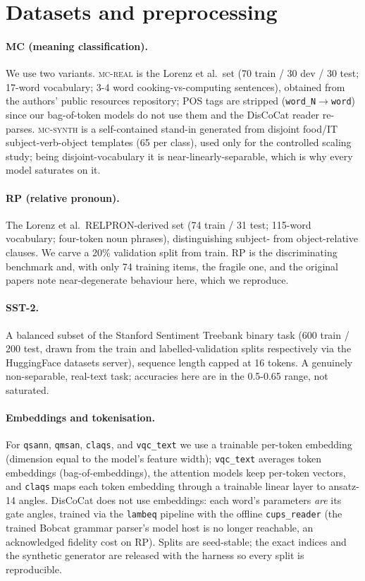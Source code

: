 \section{Datasets and preprocessing}\label{app:data}



\paragraph{MC (meaning classification).} We use two variants. \textsc{mc-real} is the Lorenz
et al.\ set (70 train / 30 dev / 30 test; 17-word vocabulary; 3-4 word cooking-vs-computing
sentences), obtained from the authors' public resources repository; POS tags are stripped
(\texttt{word\_N}$\to$\texttt{word}) since our bag-of-token models do not use them and the
DisCoCat reader re-parses. \textsc{mc-synth} is a self-contained stand-in generated from disjoint
food/IT subject-verb-object templates (65 per class), used only for the controlled scaling
study; being disjoint-vocabulary it is near-linearly-separable, which is why every model
saturates on it.

\paragraph{RP (relative pronoun).} The Lorenz et al.\ RELPRON-derived set (74 train / 31 test;
115-word vocabulary; four-token noun phrases), distinguishing subject- from object-relative
clauses. We carve a 20\% validation split from train. RP is the discriminating benchmark and,
with only 74 training items, the fragile one, and the original papers note near-degenerate
behaviour here, which we reproduce.

\paragraph{SST-2.} A balanced subset of the Stanford Sentiment Treebank binary task
(600 train / 200 test, drawn from the train and labelled-validation splits respectively via the
HuggingFace datasets server), sequence length capped at 16 tokens. A genuinely non-separable,
real-text task; accuracies here are in the 0.5-0.65 range, not saturated.

\paragraph{Embeddings and tokenisation.} For \texttt{qsann}, \texttt{qmsan}, \texttt{claqs}, and
\texttt{vqc\_text} we use a trainable per-token embedding (dimension equal to the model's feature
width); \texttt{vqc\_text} averages token embeddings (bag-of-embeddings), the attention models
keep per-token vectors, and \texttt{claqs} maps each token embedding through a trainable linear
layer to ansatz-14 angles. DisCoCat does not use embeddings: each word's parameters \emph{are}
its gate angles, trained via the \texttt{lambeq} pipeline with the offline \texttt{cups\_reader}
(the trained Bobcat grammar parser's model host is no longer reachable, an acknowledged fidelity
cost on RP). Splits are seed-stable; the exact indices and the synthetic generator are released
with the harness so every split is reproducible.

